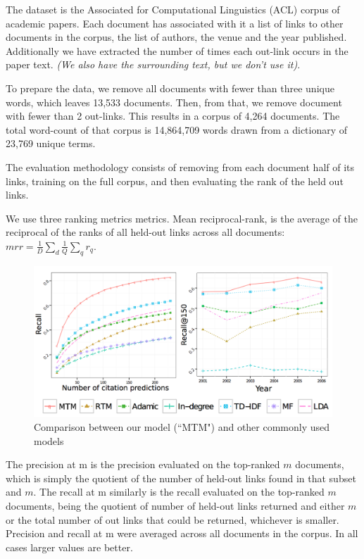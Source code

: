 The dataset is the Associated for Computational Linguistics (ACL) corpus of academic papers. Each document has associated with it a list of links to other documents in the corpus, the list of authors, the venue and the year published. Additionally we have extracted the number of times each out-link occurs in the paper text. \emph{(We also have the surrounding text, but we don't use it)}.

To prepare the data, we remove all documents with fewer than three unique words, which leaves 13,533 documents. Then, from that, we remove document with fewer than 2 out-links. This results in a corpus of 4,264 documents. The total word-count of that corpus is 14,864,709 words drawn from a dictionary of 23,769 unique terms.

The evaluation methodology consists of removing from each document half of its links, training on the full corpus, and then evaluating the rank of the held out links.

We use three ranking metrics metrics. Mean reciprocal-rank, is the average of the reciprocal of the ranks of all held-out links across all documents: $mrr = \frac{1}{D} \sum_d \frac{1}{Q} \sum_q r_q$.  


\begin{figure}
  \centering
    \hspace*{-1.5cm}\includegraphics[height=0.25\textheight]{plots/figs/fig-1.png}
  \caption{Comparison between our model (``MTM") and other commonly used models}
  \label{fig:chap5-fig-compare-2}
\end{figure}

The precision at m is the precision evaluated on the top-ranked $m$ documents, which is simply the quotient of the number of held-out links found in that subset and $m$. The recall at m similarly is the recall evaluated on the top-ranked $m$ documents, being the quotient of number of held-out links returned and either $m$ or the total number of out links that could be returned, whichever is smaller. Precision and recall at m were averaged across all documents in the corpus. In all cases larger values are better.


